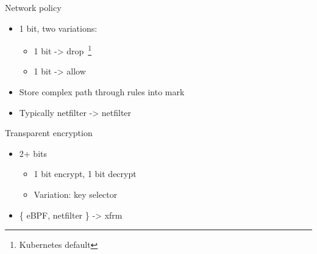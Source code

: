 \documentclass[black,white,aspectratio=169]{beamer}
\DeclareRobustCommand{\#}{\adjustbox{valign=B,totalheight=.57\baselineskip}{\oldhash}}%
\begin{document}
    \begin{frame}{Network policy}
        \begin{itemize}
            \item 1 bit, two variations:~\smallskip
            \begin{itemize}
                \item 1 bit -> drop~\footnote{Kubernetes default}~\smallskip
                \item 1 bit -> allow~\medskip %
            \end{itemize}
            \item Store complex path through rules into mark~\medskip
            \item Typically netfilter -> netfilter~\medskip
        \end{itemize}
    \end{frame}

    \begin{frame}{Transparent encryption}
        \begin{itemize}
            \item 2+ bits~\smallskip
            \begin{itemize}
                \item 1 bit encrypt, 1 bit decrypt~\smallskip
                \item Variation: key selector~\medskip
            \end{itemize}
        \item \{ eBPF, netfilter \} -> xfrm~\medskip
        \end{itemize}
    \end{frame}
\end{document}
